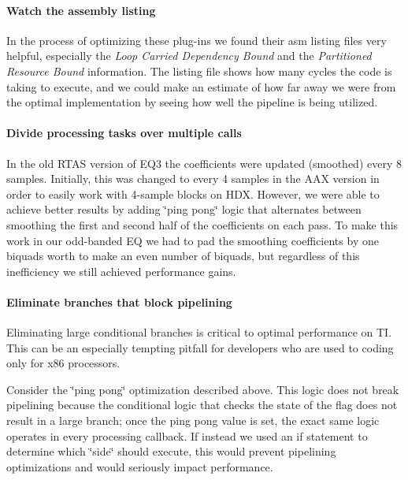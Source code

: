 \hypertarget{a00362_subsubsection__watch_the_assembly_listing_}{}\paragraph{Watch the assembly listing}\label{a00362_subsubsection__watch_the_assembly_listing_}
 In the process of optimizing these plug-\/ins we found their asm listing files very helpful, especially the {\itshape  Loop Carried Dependency Bound} and the {\itshape  Partitioned Resource Bound} information. The listing file shows how many cycles the code is taking to execute, and we could make an estimate of how far away we were from the optimal implementation by seeing how well the pipeline is being utilized.

\hypertarget{a00362_subsubsection__divide_processing_tasks_over_multiple_calls_}{}\paragraph{Divide processing tasks over multiple calls}\label{a00362_subsubsection__divide_processing_tasks_over_multiple_calls_}
 In the old R\+T\+A\+S version of E\+Q3 the coefficients were updated (smoothed) every 8 samples. Initially, this was changed to every 4 samples in the A\+A\+X version in order to easily work with 4-\/sample blocks on H\+D\+X. However, we were able to achieve better results by adding \char`\"{}ping pong\char`\"{} logic that alternates between smoothing the first and second half of the coefficients on each pass. To make this work in our odd-\/banded E\+Q we had to pad the smoothing coefficients by one biquad\textquotesingle{}s worth to make an even number of biquads, but regardless of this inefficiency we still achieved performance gains.

\hypertarget{a00362_subsubsection__eliminate_branches_that_block_pipelining_}{}\paragraph{Eliminate branches that block pipelining}\label{a00362_subsubsection__eliminate_branches_that_block_pipelining_}
 Eliminating large conditional branches is critical to optimal performance on T\+I. This can be an especially tempting pitfall for developers who are used to coding only for x86 processors.

Consider the \char`\"{}ping pong\char`\"{} optimization described above. This logic does not break pipelining because the conditional logic that checks the state of the flag does not result in a large branch; once the ping pong value is set, the exact same logic operates in every processing callback. If instead we used an if statement to determine which \char`\"{}side\char`\"{} should execute, this would prevent pipelining optimizations and would seriously impact performance.

